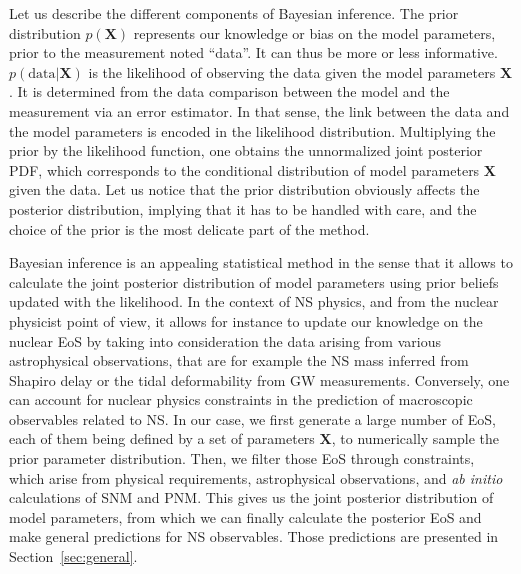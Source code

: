 Let us describe the different components of Bayesian inference. The 
prior distribution $p(\bm{X})$ represents our knowledge or bias on the 
model parameters, prior to the measurement noted ``data''. It can thus be more 
or less informative.
$p(\text{data}|\bm{X})$ is the likelihood of observing the data given the model
parameters $\bm{X}$. It is determined from the data comparison between the 
model and the measurement via an error estimator. In that sense, the link 
between the data and the model parameters is encoded in the likelihood
distribution. 
Multiplying the prior by the likelihood function, one obtains the unnormalized 
joint posterior PDF, which corresponds to the conditional distribution of 
model parameters $\bm{X}$ given the data. Let us notice that the prior 
distribution obviously affects the posterior distribution, implying that it has
to be handled with care, and the choice of the prior is the most delicate part
of the method. 

Bayesian inference is an appealing statistical method in the sense that it 
allows to calculate the joint posterior distribution of model parameters using 
prior beliefs updated with the likelihood. In the context of NS physics, and 
from the nuclear physicist point of view, it allows for instance to update our 
knowledge on the nuclear EoS by taking into consideration the data arising from 
various astrophysical observations, that are for example the NS mass inferred
from Shapiro delay or the tidal deformability from GW measurements.
Conversely, one can account for nuclear physics constraints in the prediction 
of macroscopic observables related to NS. 
In our case, we first generate a large number of EoS, each of them being 
defined by a set of parameters $\bm{X}$, to numerically sample the prior 
parameter distribution. Then, we filter those EoS through constraints, which 
arise from physical requirements, astrophysical observations, 
and \textit{ab initio} calculations of SNM and PNM. This 
gives us the joint posterior distribution of model parameters, from which we 
can finally calculate the posterior EoS and make general predictions for NS 
observables. Those predictions are presented in Section~\ref{sec:general}.

